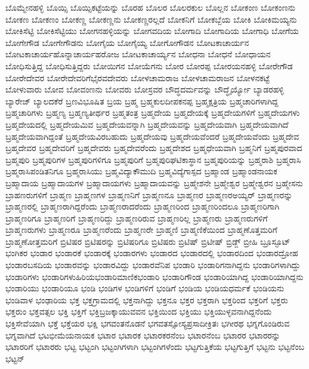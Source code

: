 {ಬೊಮ್ಮೇನಹಳ್ಳಿ
ಬೊಯ್ಸಿ
ಬೊಯ್ಸಿಕಟ್ಟೆಯನ್ನು
ಬೊರಹ
ಬೊಲರ
ಬೊಲರಕುಲ
ಬೊಲ್ಲನ
ಬೋಕಂಣ
ಬೋಕಂಣನು
ಬೋಕಣ
ಬೋಕಣಂ
ಬೋಕಣ್ಣ
ಬೋಕಣ್ಣನು
ಬೋಕಣ್ಣರಲ್ಲದೆ
ಬೋಕನಿಗೆ
ಬೋಕಬ್ಬೆಯ
ಬೋಕಿ
ಬೋಕಿಮಯ್ಯನು
ಬೋಕಿಸೆಟ್ಟಿ
ಬೋಕಿಸೆಟ್ಟಿಯು
ಬೋಗನಹಳ್ಳಿಯನ್ನು
ಬೋಗವದಿಯ
ಬೋಗಾದಿ
ಬೋಗಾದಿಯ
ಬೋಗಾಧಿ
ಬೋಗೆಯ
ಬೋಗೇಗೌಡ
ಬೋಗೇಗೌಡನು
ಬೋಗೈಯ
ಬೋಗೈಯ್ಯ
ಬೋಗೋಗೌಡನ
ಬೋಟಕಾಚಾರ್ಯನ
ಬೋಟಕಾಚಾರ್ಯಹೊನ್ನಾಚಾರ್ಯಹರೋಜ
ಬೋಟಕಾಚಾರ್ಯ್ಯನ
ಬೋಧನಾ
ಬೋಧನೆ
ಬೋಧಾಯನ
ಬೋಧಿಸುತ್ತಿದ್ದ
ಬೋಧಿಸುತ್ತಿದ್ದರು
ಬೋಯಿಗನ
ಬೋಯೆಗನು
ಬೋರ
ಬೋರಪ್ಪ
ಬೋರಯನಹಳ್ಳಿ
ಬೋರೇಗೌಡ
ಬೋರೇದೇವರ
ಬೋರೇದೇವರಿಗೆಭೈರವದೇವರು
ಬೋಳಚಾಮರಾಜ
ಬೋಳಚಾಮರಾಜನ
ಬೋಳನಕಟ್ಟೆ
ಬೋಳುವಾರು
ಬೋವ
ಬೋವಂಣನು
ಬೋವರು
ಬೋಸ್ರವರ
ಬೌದ್ಧದರ್ಮವನ್ನು
ಬೌದ್ಧೈರ್ಯ್ಯೋ
ಬ್ಯಾಡರಹಳ್ಳಿ
ಬ್ಯಾರೇಜ್
ಬ್ಯಾಲದಕೆರೆ
ಬ್ರಣವಿಭೂಷಿತ
ಬ್ರಯ
ಬ್ರಹ್ಮ
ಬ್ರಹ್ಮಕುಲದೀಪಕನಪ್ಪ
ಬ್ರಹ್ಮಕ್ಷತ್ರಿಯ
ಬ್ರಹ್ಮಚಾರಿಗಳಾಗಿದ್ದ
ಬ್ರಹ್ಮಚಾರಿಗಳು
ಬ್ರಹ್ಮಣ್ಯ
ಬ್ರಹ್ಮಣ್ಯತೀರ್ಥರ
ಬ್ರಹ್ಮತಂತ್ರ
ಬ್ರಹ್ಮದೇಯ
ಬ್ರಹ್ಮದೇಯಕ್ಕೆ
ಬ್ರಹ್ಮದೇಯಗಳಿಗೆ
ಬ್ರಹ್ಮದೇಯಗಳು
ಬ್ರಹ್ಮದೇಯದಲ್ಲಿ
ಬ್ರಹ್ಮದೇಯಮಿವ
ಬ್ರಹ್ಮದೇಯವನ್ನಾಗಿ
ಬ್ರಹ್ಮದೇಯವನ್ನು
ಬ್ರಹ್ಮದೇಯವಾಗಿ
ಬ್ರಹ್ಮದೇಯವಾಗಿದೆ
ಬ್ರಹ್ಮದೇಯವಾಗಿದ್ದಂತೆ
ಬ್ರಹ್ಮದೇಯವಿರಬಹುದು
ಬ್ರಹ್ಮದೇಯವು
ಬ್ರಹ್ಮದೇಯವೆಂದರೆ
ಬ್ರಹ್ಮದೇಯವೆಂದು
ಬ್ರಹ್ಮದೇವ
ಬ್ರಹ್ಮದೇವರ
ಬ್ರಹ್ಮದೇವರಿಗೆ
ಬ್ರಹ್ಮದೇವರು
ಬ್ರಹ್ಮದೇವರೆಂದು
ಬ್ರಹ್ಮದೇಶದ
ಬ್ರಹ್ಮಧೇಯವಾಗಿ
ಬ್ರಹ್ಮನಿಗೆ
ಬ್ರಹ್ಮಪುರವಾದ
ಬ್ರಹ್ಮಪುರಿ
ಬ್ರಹ್ಮಪುರಿಗಳ
ಬ್ರಹ್ಮಪುರಿಗಳಿಗೂ
ಬ್ರಹ್ಮಪುರಿಗೆ
ಬ್ರಹ್ಮಪುರಿಘಟಿಕಾಸ್ಥಾನ
ಬ್ರಹ್ಮಪುರಿಯನ್ನು
ಬ್ರಹ್ಮರಾಶಿ
ಬ್ರಹ್ಮರಾಸಿ
ಬ್ರಹ್ಮರಾಸಿಪಂಡಿತನಿಗೂ
ಬ್ರಹ್ಮರಾಸಿಯು
ಬ್ರಹ್ಮವಿದ್ಯಾಕೌಮುದಿ
ಬ್ರಹ್ಮವಿದ್ಯೆಗಾಸ್ಪದ
ಬ್ರಹ್ಮಾಂಡ
ಬ್ರಹ್ಮಾಂಡನಾಯಕ
ಬ್ರಹ್ಮಾದಾಯ
ಬ್ರಹ್ಮಾದಾಯಗಳ
ಬ್ರಹ್ಮಾದಾಯಗಳು
ಬ್ರಹ್ಮಾದಾಯವನ್ನು
ಬ್ರಹ್ಮೇಶನೇ
ಬ್ರಹ್ಮೇಶ್ವರ
ಬ್ರಹ್ಮೇಶ್ವರನ
ಬ್ರಹ್ಮೇಸನು
ಬ್ರಾಹಣರುಗಳಿಗೆ
ಬ್ರಾಹ್ಮಣ
ಬ್ರಾಹ್ಮಣಗಳ
ಬ್ರಾಹ್ಮಣನಿಗೆ
ಬ್ರಾಹ್ಮಣನೂ
ಬ್ರಾಹ್ಮಣರ
ಬ್ರಾಹ್ಮಣರಅಯ್ಯರ್
ಬ್ರಾಹ್ಮಣರನ್ನು
ಬ್ರಾಹ್ಮಣರಲ್ಲಿ
ಬ್ರಾಹ್ಮಣರಾಗಿದ್ದರೆಂದು
ಬ್ರಾಹ್ಮಣರಾದರೆಂದು
ಬ್ರಾಹ್ಮಣರಿಂದ
ಬ್ರಾಹ್ಮಣರಿಂದಲೂ
ಬ್ರಾಹ್ಮಣರಿಗಾಗಿ
ಬ್ರಾಹ್ಮಣರಿಗೂ
ಬ್ರಾಹ್ಮಣರಿಗೆ
ಬ್ರಾಹ್ಮಣರಿದ್ದು
ಬ್ರಾಹ್ಮಣರಿರುವ
ಬ್ರಾಹ್ಮಣರಿಲ್ಲ
ಬ್ರಾಹ್ಮಣರು
ಬ್ರಾಹ್ಮಣರುಗಳಿಗೆ
ಬ್ರಾಹ್ಮಣರುಗಳು
ಬ್ರಾಹ್ಮಣರೂ
ಬ್ರಾಹ್ಮಣರೆಂದು
ಬ್ರಾಹ್ಮಣರೇ
ಬ್ರಾಹ್ಮಣಿ
ಬ್ರಾಹ್ಮಣಿಕೆಯಿಂದ
ಬ್ರಾಹ್ಮಣೊತ್ತಮರಿಗೆ
ಬ್ರಾಹ್ಮಣೋತ್ತಮರಿಗೆ
ಬ್ರಿಟಿಷರ
ಬ್ರಿಟಿಷರನ್ನು
ಬ್ರಿಟಿಷರಿಗೂ
ಬ್ರಿಟಿಷರು
ಬ್ರಿಟಿಷ್
ಬ್ರಿಟೀಷ್
ಬ್ರಿಡ್ಜ್
ಬ್ರೀಹಿ
ಬ್ರೂಸ್ಫೂಟ್
ಭಂಗಿಕರ
ಭಂಡಾರ
ಭಂಡಾರಕೆ
ಭಂಡಾರಕ್ಕೆ
ಭಂಡಾರಗಳು
ಭಂಡಾರದ
ಭಂಡಾರದಲ್ಲಿ
ಭಂಡಾರದಿಂದ
ಭಂಡಾರದ್ರೋಹ
ಭಂಡಾರಬಸದಿಯ
ಭಂಡಾರವನ್ನು
ಭಂಡಾರವಿದ್ದು
ಭಂಡಾರವೆನಿಪ
ಭಂಡಾರಿ
ಭಂಡಾರಿಗನಾಗಿದ್ದನು
ಭಂಡಾರಿಗಳಾಗಿದ್ದು
ಭಂಡಾರಿಗಳು
ಭಂಡಾರಿಗಳುಹಿರಿಯಭಂಡಾರಿಮಾಣಿಕಭಂಡಾರಿ
ಭಂಡಾರಿಗೌಂಡ
ಭಂಡಾರಿಯಾಗಿದ್ದ
ಭಂಡಾರಿಯಾಗಿದ್ದನು
ಭಂಡಾರಿಯು
ಭಂಡಾರಿಯೂ
ಭಂಡಿ
ಭಂಡಿಗಳ
ಭಂಡಿಗಳಿಗೆ
ಭಂಡಿಗೆ
ಭಂಡಿಯ
ಭಂಡಿಯಧರ್ಮಕೆ
ಭಂಡಿಯನು
ಭಂಡಿವಾಳ
ಭಂಢಾರಿಯ
ಭಕ್ತ
ಭಕ್ತಗ್ರಾಮದಲ್ಲಿ
ಭಕ್ತನಾಗಿದ್ದು
ಭಕ್ತನೂ
ಭಕ್ತರ
ಭಕ್ತರಾಗಿ
ಭಕ್ತರಿಂದ
ಭಕ್ತರಿಗೆ
ಭಕ್ತರು
ಭಕ್ತರುಂ
ಭಕ್ತವತ್ಸಲ
ಭಕ್ತಿ
ಭಕ್ತಿಗೆ
ಭಕ್ತಿಬ್ರಜಕ್ಕಾಯುವವನ
ಭಕ್ತಿಯಿಂದ
ಭಕ್ತಿಯು
ಭಕ್ತಿಯುಳ್ಳವನಾಗಿದ್ದನೆಂದು
ಭಕ್ತಿಸೇವೆಯಾಗಿ
ಭಕ್ತೆ
ಭಕ್ತೆಯರ
ಭಕ್ಷಿ
ಭಗವಂತನೊಡನೆ
ಭಗವತಸ್ಸೋಸ್ಯಪ್ರಸಾದೀಕ್ರಿತಃ
ಭಗೀರಥ
ಭಗ್ನಗೊಂಡಿರುವ
ಭಗ್ನವಾಗಿದೆ
ಭಟಭೀಮೆಯನಾಯಕ
ಭಟಾರ
ಭಟಾರಕ
ಭಟಾರಕರನೆಂಬ
ಭಟಾರನೆಂಬ
ಭಟಾರರ
ಭಟಾರರನ್ನು
ಭಟಾರರಿಗೆ
ಭಟಾರರು
ಭಟ್ಟ
ಭಟ್ಟಂಗಿ
ಭಟ್ಟಂಗಿಗಳಾಗಿ
ಭಟ್ಟಂಗಿಗಳೆಂದು
ಭಟ್ಟಗುತ್ತಿಕೆಯ
ಭಟ್ಟಗುತ್ತಿಗೆ
ಭಟ್ಟನು
ಭಟ್ಟನೆಂಬ
ಭಟ್ಟನ್
}
